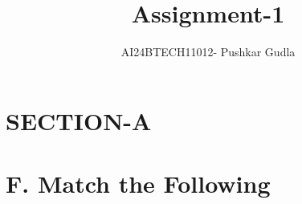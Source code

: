 \documentclass[journal,12pt,onecolumn]{IEEEtran}
\theoremstyle{remark}
\begin{document}

\vspace{3cm}

\title{\textbf{Assignment-1}}
\author{AI24BTECH11012- Pushkar Gudla}
\maketitle
\bigskip

\renewcommand{\thefigure}{\theenumi}
\renewcommand{\thetable}{\theenumi}
\setlength{\columnsep}{2.5em}
\section*{\textbf{SECTION-A}}
\section*{\textbf{F.}  Match the Following}
\end{document}
